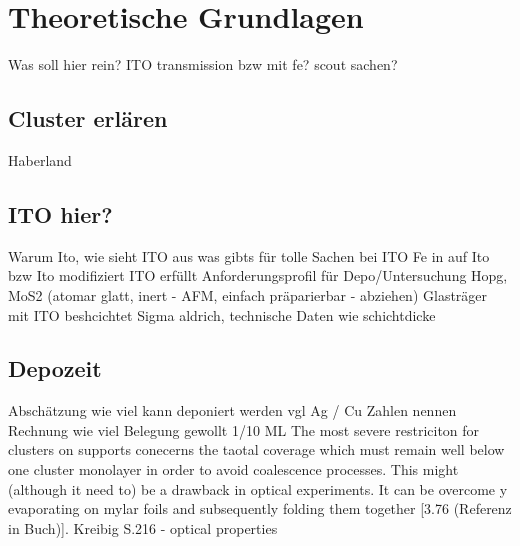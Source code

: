 \chapter{Theoretische Grundlagen}
Was soll hier rein? ITO transmission bzw mit fe? scout sachen?
\section{Cluster erlären}
Haberland
\section{ITO hier?}
Warum Ito, wie sieht ITO aus
was gibts für tolle Sachen  bei ITO
Fe in auf Ito bzw Ito modifiziert
ITO erfüllt Anforderungsprofil für Depo/Untersuchung
Hopg, MoS2 (atomar glatt, inert - AFM, einfach präparierbar - abziehen)
Glasträger mit ITO beshcichtet Sigma aldrich, technische Daten wie schichtdicke
\section{Depozeit}
Abschätzung wie viel kann deponiert werden vgl Ag / Cu Zahlen nennen
Rechnung wie viel Belegung gewollt 1/10 ML
The most severe restriciton for clusters on supports conecerns the taotal coverage which must remain well below one cluster monolayer in order to avoid coalescence processes.
This might (although it need to) be a drawback in optical experiments.
It can be overcome y evaporating on mylar foils and subsequently folding them together [3.76 (Referenz in Buch)].
Kreibig \cite[S.216]{Kreibig.1995} S.216 - optical properties

